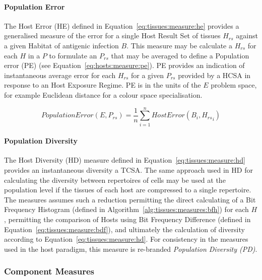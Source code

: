\paragraph{Population Error}
The Host Error (HE) defined in Equation~\ref{eq:tissues:measure:he} provides a generalised measure of the error for a single Host Result Set of tissues $H_{rs}$ against a given Habitat of antigenic infection $B$. This measure may be calculate a $H_{rs}$ for each $H$ in a $P$ to formulate an $P_{rs}$ that may be averaged to define a Population error (PE) (see Equation~\ref{eq:hosts:measure:pe}). PE provides an indication of instantaneous average error for each $H_{rs}$ for a given $P_{rs}$ provided by a HCSA in response to an Host Exposure Regime. PE is in the units of the $E$ problem space, for example Euclidean distance for a colour space specialisation.

\begin{equation}
	PopulationError(E, P_{rs}) = \frac{1}{n} \sum_{i=1}^n HostError(B_i, {H_{rs}}_i)
	\label{eq:hosts:measure:pe}
\end{equation}


%
%
\paragraph{Population Diversity}
The Host Diversity (HD) measure defined in Equation~\ref{eq:tissues:measure:hd} provides an instantaneous diversity a TCSA. The same approach used in HD for calculating the diversity between repertoires of cells may be used at the population level if the tissues of each host are compressed to a single repertoire. The measures assumes such a reduction permitting the direct calculating of a Bit Frequency Histogram (defined in Algorithm~\ref{alg:tissues:measures:bfh}) for each $H$, permitting the comparison of Hosts using Bit Frequency Difference (defined in Equation~\ref{eq:tissues:measure:bdf}), and ultimately the calculation of diversity according to Equation~\ref{eq:tissues:measure:hd}. For consistency in the measures used in the host paradigm, this measure is re-branded \emph{Population Diversity (PD)}.


%
%
\subsubsection{Component Measures}

%
%
